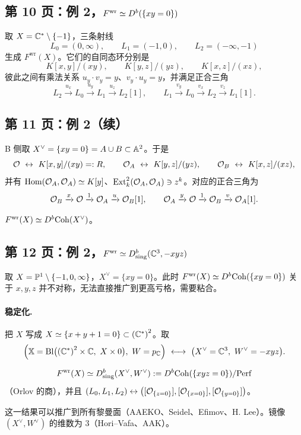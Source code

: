 \subsection*{第 10 页：例 2，$F^{\mathrm{wr}}\simeq D^{b}(\{xy=0\})$}

取 $X=\mathbb{C}^*\setminus\{-1\}$，三条射线
\[
L_0=(0,\infty),\qquad L_1=(-1,0),\qquad L_2=(-\infty,-1)
\]
生成 $F^{\mathrm{wr}}(X)$。它们的自同态环分别是
\[
K[x,y]/(xy),\qquad K[y,z]/(yz),\qquad K[x,z]/(xz),
\]
彼此之间有乘法关系 $u_y\cdot v_y=y$、$v_y\cdot u_y=y$，并满足正合三角
\[
L_2\xrightarrow{u_x}L_0\xrightarrow{u_y}L_1\xrightarrow{u_z}L_2[1],
\qquad
L_1\xrightarrow{v_y}L_0\xrightarrow{v_x}L_2\xrightarrow{v_z}L_1[1].
\]

\subsection*{第 11 页：例 2（续）}

B 侧取 $X^\vee=\{xy=0\}=A\cup B\subset\mathbb{A}^2$。于是
\[
\OO\ \leftrightarrow\ K[x,y]/(xy)=:R,\qquad
\OO_A\ \leftrightarrow\ K[y,z]/(yz),\qquad
\OO_B\ \leftrightarrow\ K[x,z]/(xz),
\]
并有 $\operatorname{Hom}(\mathcal{O}_A,\mathcal{O}_A)\simeq K[y]$、$\operatorname{Ext}^2_k(\mathcal{O}_A,\mathcal{O}_A)\ni z^k$。对应的正合三角为
\[
\mathcal{O}_B\xrightarrow{x}\mathcal{O}\xrightarrow{1}\mathcal{O}_A\xrightarrow{u}\mathcal{O}_B[1],
\qquad
\mathcal{O}_A\xrightarrow{y}\mathcal{O}\xrightarrow{1}\mathcal{O}_B\xrightarrow{v}\mathcal{O}_A[1].
\]
\begin{theo}[AAEKO]
$F^{\mathrm{wr}}(X)\simeq D^{b}\mathrm{Coh}(X^\vee)$。
\end{theo}

\subsection*{第 12 页：例 2，$F^{\mathrm{wr}}\simeq D^{b}_{\mathrm{sing}}(\mathbb{C}^3,-xyz)$}

取 $X=\mathbb{P}^1\setminus\{-1,0,\infty\}$，$X^\vee=\{xy=0\}$。此时 $F^{\mathrm{wr}}(X)\simeq D^{b}\mathrm{Coh}(\{xy=0\})$ 关于 $x,y,z$ 并不对称，无法直接推广到更高亏格，需要粘合。

\paragraph{稳定化.} 把 $X$ 写成 $X\simeq\{x+y+1=0\}\subset\left(\mathbb{C}^*\right)^2$。取
\[
\Bigl(\mathbb X=\mathrm{Bl}\bigl(\left(\C^*\right)^2\times\C,\ X\times0\bigr),\ W=p_{\C}\Bigr)
\ \longleftrightarrow\
\bigl(X^\vee=\C^3,\ W^\vee=-xyz\bigr).
\]
\begin{theo}[AAEKO]
\[
F^{\mathrm{wr}}(X)\simeq D^{b}_{\mathrm{sing}}(X^\vee,W^\vee):=D^{b}\mathrm{Coh}(\{xyz=0\})/\mathrm{Perf}
\]
（Orlov 的商），并且 $(L_0,L_1,L_2)\leftrightarrow\bigl([\mathcal{O}_{\{z=0\}}],[\mathcal{O}_{\{x=0\}}],[\mathcal{O}_{\{y=0\}}]\bigr)$。
\end{theo}
这一结果可以推广到所有黎曼面（AAEKO、Seidel、Efimov、H. Lee）。镜像 $(X^\vee,W^\vee)$ 的维数为 $3$（Hori--Vafa、AAK）。

